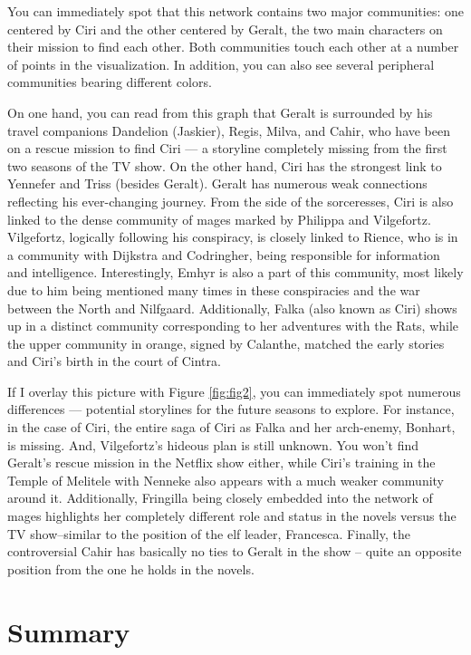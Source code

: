 \documentclass[fleqn,12pt]{wlscirep}
\begin{document}
You can immediately spot that this network contains two major communities: one centered by Ciri and the other centered by Geralt, the two main characters on their mission to find each other. Both communities touch each other at a number of points in the visualization. In addition, you can also see several peripheral communities bearing different colors.

On one hand, you can read from this graph that Geralt is surrounded by his travel companions Dandelion (Jaskier), Regis, Milva, and Cahir, who have been on a rescue mission to find Ciri — a storyline completely missing from the first two seasons of the TV show. On the other hand, Ciri has the strongest link to Yennefer and Triss (besides Geralt). Geralt has numerous weak connections reflecting his ever-changing journey. From the side of the sorceresses, Ciri is also linked to the dense community of mages marked by Philippa and Vilgefortz. Vilgefortz, logically following his conspiracy, is closely linked to Rience, who is in a community with Dijkstra and Codringher, being responsible for information and intelligence. Interestingly, Emhyr is also a part of this community, most likely due to him being mentioned many times in these conspiracies and the war between the North and Nilfgaard. Additionally, Falka (also known as Ciri) shows up in a distinct community corresponding to her adventures with the Rats, while the upper community in orange, signed by Calanthe, matched the early stories and Ciri’s birth in the court of Cintra.

If I overlay this picture with Figure \ref{fig:fig2}, you can immediately spot numerous differences — potential storylines for the future seasons to explore. For instance, in the case of Ciri, the entire saga of Ciri as Falka and her arch-enemy, Bonhart, is missing. And, Vilgefortz’s hideous plan is still unknown. You won’t find Geralt’s rescue mission in the Netflix show either, while Ciri’s training in the Temple of Melitele with Nenneke also appears with a much weaker community around it. Additionally, Fringilla being closely embedded into the network of mages highlights her completely different role and status in the novels versus the TV show–similar to the position of the elf leader, Francesca. Finally, the controversial Cahir has basically no ties to Geralt in the show – quite an opposite position from the one he holds in the novels.



\section{Summary}
\end{document}
